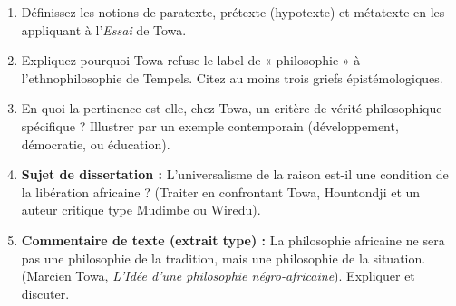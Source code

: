 \documentclass[11pt]{article}
\newcommand{\cle}[1]{{\popxbold\color{popdark}#1}}
\begin{document}
\begin{exercice}
\begin{enumerate}
    \item Définissez les notions de \cle{paratexte}, \cle{prétexte (hypotexte)} et \cle{métatexte} en les appliquant à l'\emph{Essai} de Towa.
    \item Expliquez pourquoi Towa refuse le label de « philosophie » à l'ethnophilosophie de Tempels. Citez au moins trois griefs épistémologiques.
    \item En quoi la \cle{pertinence} est-elle, chez Towa, un critère de vérité philosophique spécifique ? Illustrer par un exemple contemporain (développement, démocratie, ou éducation).
    \item \textbf{Sujet de dissertation :} \guillemotleft L'universalisme de la raison est-il une condition de la libération africaine ? \guillemotright (Traiter en confrontant Towa, Hountondji et un auteur critique type Mudimbe ou Wiredu).
    \item \textbf{Commentaire de texte (extrait type) :} \guillemotleft La philosophie africaine ne sera pas une philosophie de la tradition, mais une philosophie de la situation. \guillemotright (Marcien Towa, \emph{L'Idée d'une philosophie négro-africaine}). Expliquer et discuter.
\end{enumerate}
\end{exercice}
\end{document}
